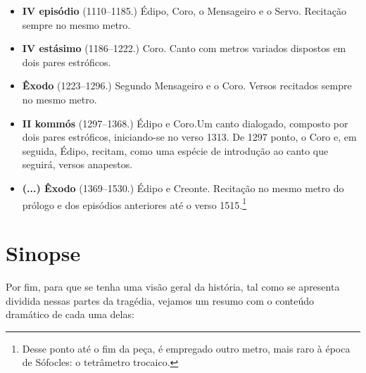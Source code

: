\begin{itemize}
\item \textbf{IV episódio} (1110--1185.)        
	 {Édipo, Coro, o Mensageiro e o Servo}. Recitação sempre no mesmo metro. 

\item \textbf{IV estásimo} (1186--1222.)        
	 {Coro}. Canto com metros variados dispostos em dois pares estróficos. 

\item \textbf{Êxodo} (1223--1296.)                  
	 {Segundo Mensageiro e o Coro}. Versos recitados sempre no mesmo metro. 

\item \textbf{II kommós} (1297--1368.)         
	 {Édipo e Coro}.Um canto dialogado, composto por dois pares estróficos, iniciando-se no verso 1313. De 1297 
	 ponto, o Coro e, em seguida, Édipo, recitam, como uma espécie de introdução ao canto que seguirá, versos anapestos.

\item \textbf{(...) Êxodo} (1369--1530.)   
	 {Édipo e Creonte}. Recitação no mesmo metro do prólogo e dos episódios anteriores até o verso 1515.\footnote{
	 Desse ponto até o fim da peça, é empregado outro metro, mais raro à época de Sófocles: o tetrâmetro trocaico.}  
\end{itemize}

\section{Sinopse}

Por fim, para que se tenha uma visão geral da história, tal como se
apresenta dividida nessas partes da tragédia, vejamos um resumo com o
conteúdo dramático de cada uma delas:

